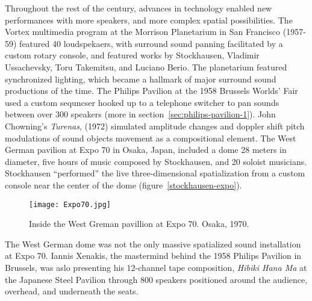 Throughout the rest of the century, advances in technology enabled new
performances with more speakers, and more complex spatial
possibilities. The Vortex multimedia program at the Morrison
Planetarium in San Francisco (1957-59) featured 40 loudspekaers, with
surround sound panning facilitated by a custom rotary console, and
featured works by Stockhausen, Vladimir Ussachevsky, Toru Takemitsu,
and Luciano Berio. The planetarium featured synchronized lighting,
which became a hallmark of major surround sound productions of the
time. The Philips Pavilion at the 1958 Brussels Worlds' Fair used a
custom sequncser hooked up to a telephone switcher to pan sounds
between over 300 speakers (more in
section~\ref{sec:philips-pavilion-1}).  John Chowning’s
\textit{Turenas}, (1972) simulated amplitude changes and doppler shift
pitch modulations of sound objects movement as a compositional
element.\cite{Chowning2011} The West German pavilion at Expo 70 in
Osaka, Japan, included a dome 28 meters in diameter, five hours of
music composed by Stockhausen, and 20 soloist musicians. Stockhausen
``performed'' the live three-dimensional spatialization from a custom
console near the center of the dome (figure~\ref{stockhausen-expo}).
\begin{figure}
\texttt{[image: Expo70.jpg]}
\caption{Inside the West Greman pavillion at Expo 70. Osaka, 1970.}
\label{fig:stockhausen-expo}
\end{figure}
The West German dome was not the only massive spatialized sound
installation at Expo 70. Iannis Xenakis, the mastermind behind the
1958 Philips Pavilion in Brussels, was aslo presenting his 12-channel
tape composition, \textit{Hibiki Hana Ma} at the Japanese Steel
Pavilion through 800 speakers positioned around the audience,
overhead, and underneath the seats. 


